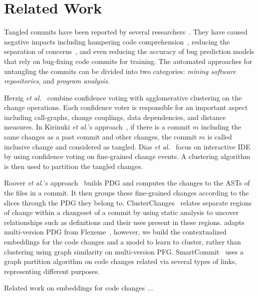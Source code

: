 \section{Related Work}
\label{related:sec}

Tangled commits have been reported by several
researchers~\cite{tao-fse12,kim-emse16,kim-msr13,hill-tse12,nguyen-issre13,flexeme-fse20,smartcommit-fse21}. They
have caused negative impacts including hampering code
comprehension~\cite{tao-fse12}, reducing the separation of
concerns~\cite{flexeme-fse20}, and even reducing the accuracy of bug
prediction models that rely on bug-fixing code commits for training.
The automated approaches for untangling the commits can be divided
into two categories: {\em mining software repositories}, and {\em
  program analysis}.

 Herzig {\em et
  al.}~\cite{kim-msr13,kim-emse16} combine confidence voting with
agglomerative clustering on the change operations. Each confidence
voter is responsible for an important aspect including call-graphs,
change couplings, data dependencies, and distance measures. In
Kirinuki {\em et al.}'s approach~\cite{higo-apsec16, higo-icpc14}, if
there is a commit $m$ including the same changes as a past commit and
other changes, the commit $m$ is called inclusive change and
considered as tangled.  Dias {\em et al.}~\cite{dias-saner15} focus on
interactive IDE by using confidence voting on fine-grained change
events. A clustering algorithm is then used to partition the tangled
changes.


 Roover {\em et al.}'s
approach~\cite{roover-scam18} builds PDG and computes the changes to
the ASTs of the files in a commit. It then groups these fine-grained
changes according to the slices through the PDG they belong to.
ClusterChanges~\cite{barnett-icse15} relates separate regions of
change within a changeset of a commit by using static analysis to
uncover relationships such as definitions and their uses present in
these regions. {\tool} adapts multi-version PDG from
Flexeme~\cite{flexeme-fse20}, however, we build the contextualized
embeddings for the code changes and a model to learn to cluster,
rather than clustering using graph similarity on multi-version PFG.
SmartCommit~\cite{smart-commit} uses a graph partition algorithm
on code changes related via several types of links, representing
different purposes.



Related work on embeddings for code changes ...
